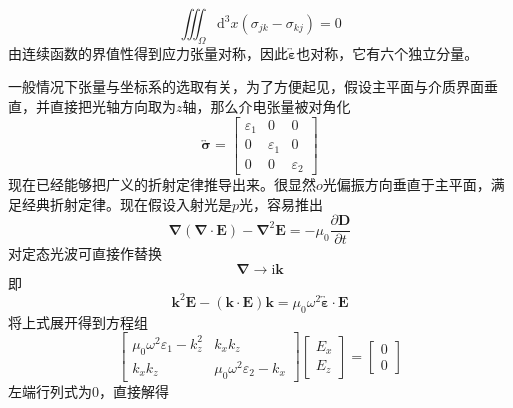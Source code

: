 \documentclass[12pt, a4paper, oneside]{ctexart}
\begin{document}
	\begin{equation}
		\iiint_{\Omega}\mathrm{d}^{3}x(\sigma_{jk}-\sigma_{kj})=0
	\end{equation}
	\quad\quad  由连续函数的界值性得到应力张量对称，因此$\overleftrightarrow{\boldsymbol{\varepsilon}}$也对称，它有六个独立分量。\par 
	一般情况下张量与坐标系的选取有关，为了方便起见，假设主平面与介质界面垂直，并直接把光轴方向取为$z$轴，那么介电张量被对角化
	\begin{equation}
		\overleftrightarrow{\boldsymbol{\sigma}}=\begin{bmatrix}
		\varepsilon_{1}	& 0 & 0\\
		0	& \varepsilon_{1} & 0\\
		0	& 0 & \varepsilon_{2}
		\end{bmatrix}
	\end{equation}
	\quad\quad 现在已经能够把广义的折射定律推导出来。很显然$o$光偏振方向垂直于主平面，满足经典折射定律。现在假设入射光是$p$光，容易推出
	\begin{equation}
		\boldsymbol{\nabla}\left(\boldsymbol{\nabla}\cdot\boldsymbol{E}\right)-\boldsymbol{\nabla}^{2}\boldsymbol{E}=-\mu_{0}\dfrac{\partial\boldsymbol{D}}{\partial t}
	\end{equation}
	\quad\quad 对定态光波可直接作替换
	\begin{equation}
		\boldsymbol{\nabla}\to\mathrm{i}\boldsymbol{k}
	\end{equation}
	\quad\quad 即
	\begin{equation}
		\boldsymbol{k}^{2}\boldsymbol{E}-\left(\boldsymbol{k}\cdot\boldsymbol{E}\right)\boldsymbol{k}=\mu_{0}\omega^{2}\overleftrightarrow{\boldsymbol{\varepsilon}}\cdot\boldsymbol{E}
	\end{equation}
	\quad\quad 将上式展开得到方程组
	\begin{equation}
		\begin{bmatrix}
			\mu_{0}\omega^{2}\varepsilon_{1}-k_{z}^{2} & k_{x}k_{z}\\
			k_{x}k_{z} & \mu_{0}\omega^{2}\varepsilon_{2}-k_{x}
		\end{bmatrix}
		\begin{bmatrix}
			E_{x} \\ E_{z}
		\end{bmatrix}
		=
		\begin{bmatrix}
			0 \\ 0
		\end{bmatrix}
	\end{equation}
	\quad\quad 左端行列式为$0$，直接解得
\end{document}
